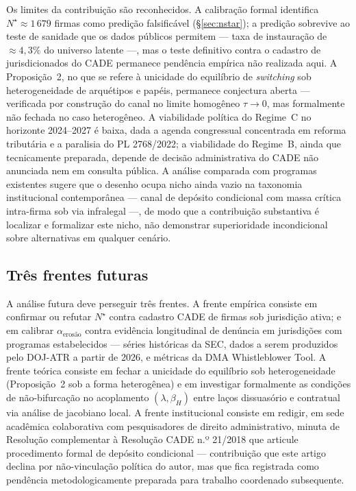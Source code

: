 \documentclass[12pt,a4paper]{article}
\begin{document}
Os limites da contribuição são reconhecidos. A calibração formal
identifica $N^\star \approx 1\,679$ firmas como predição falsificável
(\S\ref{sec:nstar}); a predição sobrevive ao teste de sanidade que os dados
públicos permitem --- taxa de instauração de $\approx 4{,}3\%$ do universo
latente ---, mas o teste definitivo contra o cadastro de jurisdicionados do
CADE permanece pendência empírica não realizada aqui. A
Proposição~2, no que se refere à unicidade do equilíbrio de \emph{switching}
sob heterogeneidade de arquétipos e papéis, permanece conjectura aberta ---
verificada por construção do canal no limite homogêneo $\tau \to 0$, mas
formalmente não fechada no caso heterogêneo. A viabilidade
política do Regime~C no horizonte 2024--2027 é baixa, dada a agenda congressual
concentrada em reforma tributária e a paralisia do PL 2768/2022; a
viabilidade do Regime~B, ainda que tecnicamente preparada, depende de decisão
administrativa do CADE não anunciada nem em consulta pública. A análise
comparada com programas existentes sugere que o desenho ocupa nicho ainda
vazio na taxonomia institucional contemporânea --- canal de depósito
condicional com massa crítica intra-firma sob via infralegal ---, de modo que
a contribuição substantiva é localizar e formalizar este nicho, não demonstrar
superioridade incondicional sobre alternativas em qualquer cenário.

\subsection{Três frentes futuras}

A análise futura deve perseguir três frentes. A frente empírica consiste em
confirmar ou refutar $N^\star$ contra cadastro CADE de firmas sob jurisdição
ativa; e em calibrar $\alpha_{\text{erosão}}$ contra evidência longitudinal de
denúncia em jurisdições com programas estabelecidos --- séries históricas da
SEC, dados a serem produzidos pelo DOJ-ATR a partir de 2026, e métricas da
DMA Whistleblower Tool. A frente teórica consiste em fechar a unicidade do
equilíbrio sob heterogeneidade (Proposição~2 sob a forma heterogênea) e em
investigar formalmente as condições de não-bifurcação no acoplamento
$(\lambda, \beta_H)$ entre laços dissuasório e contratual via análise de
jacobiano local. A frente institucional consiste em redigir, em sede
acadêmica colaborativa com pesquisadores de direito administrativo, minuta de
Resolução complementar à Resolução CADE n.º 21/2018 que articule procedimento
formal de depósito condicional --- contribuição que este artigo declina por
não-vinculação política do autor, mas que fica registrada como pendência
metodologicamente preparada para trabalho coordenado subsequente.



\end{document}
